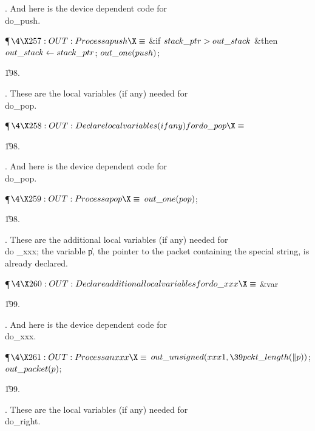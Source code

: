 . And here is the device dependent code for \\{do\_push}.

\Y\P$\4\X257:OUT: Process a \\{push}\X\S$\6
\&{if} $\\{stack\_ptr}>\\{out\_stack}$ \1\&{then}\5
$\\{out\_stack}\K\\{stack\_ptr}$;\2\6
$\\{out\_one}(\\{push})$;\par
\U198.\fi

. These are the local variables (if any) needed for \\{do\_pop}.

\Y\P$\4\X258:OUT: Declare local variables (if any) for \\{do\_pop}\X\S$\par
\U198.\fi

. And here is the device dependent code for \\{do\_pop}.

\Y\P$\4\X259:OUT: Process a \\{pop}\X\S$\6
$\\{out\_one}(\\{pop})$;\par
\U198.\fi

. These are the additional local variables (if any) needed for \\{do%
\_xxx};
the variable \|p, the pointer to the packet containing the special
string, is already declared.

\Y\P$\4\X260:OUT: Declare additional local variables for \\{do\_xxx}\X\S$\6
\4\&{var} \par
\U199.\fi

. And here is the device dependent code for \\{do\_xxx}.

\Y\P$\4\X261:OUT: Process an \\{xxx}\X\S$\6
$\\{out\_unsigned}(\\{xxx1},\39\\{pckt\_length}(\|p))$;\5
$\\{out\_packet}(\|p)$;\par
\U199.\fi

. These are the local variables (if any) needed for \\{do\_right}.

